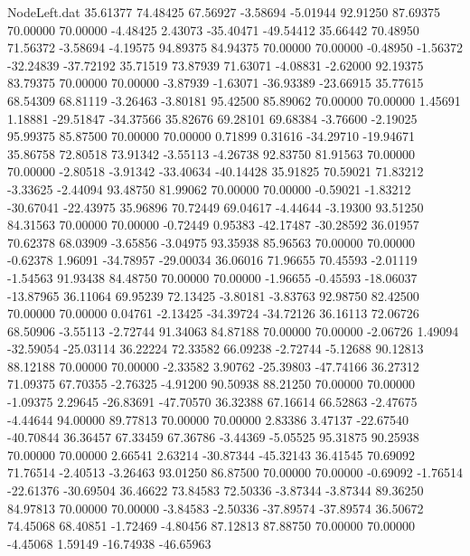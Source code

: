 \begin{filecontents}{NodeLeft.dat}
  35.61377   74.48425   67.56927    -3.58694   -5.01944   92.91250   87.69375   70.00000   70.00000   -4.48425    2.43073  -35.40471  -49.54412
  35.66442   70.48950   71.56372    -3.58694   -4.19575   94.89375   84.94375   70.00000   70.00000   -0.48950   -1.56372  -32.24839  -37.72192
  35.71519   73.87939   71.63071    -4.08831   -2.62000   92.19375   83.79375   70.00000   70.00000   -3.87939   -1.63071  -36.93389  -23.66915
  35.77615   68.54309   68.81119    -3.26463   -3.80181   95.42500   85.89062   70.00000   70.00000    1.45691    1.18881  -29.51847  -34.37566
  35.82676   69.28101   69.68384    -3.76600   -2.19025   95.99375   85.87500   70.00000   70.00000    0.71899    0.31616  -34.29710  -19.94671
  35.86758   72.80518   73.91342    -3.55113   -4.26738   92.83750   81.91563   70.00000   70.00000   -2.80518   -3.91342  -33.40634  -40.14428
  35.91825   70.59021   71.83212    -3.33625   -2.44094   93.48750   81.99062   70.00000   70.00000   -0.59021   -1.83212  -30.67041  -22.43975
  35.96896   70.72449   69.04617    -4.44644   -3.19300   93.51250   84.31563   70.00000   70.00000   -0.72449    0.95383  -42.17487  -30.28592
  36.01957   70.62378   68.03909    -3.65856   -3.04975   93.35938   85.96563   70.00000   70.00000   -0.62378    1.96091  -34.78957  -29.00034
  36.06016   71.96655   70.45593    -2.01119   -1.54563   91.93438   84.48750   70.00000   70.00000   -1.96655   -0.45593  -18.06037  -13.87965
  36.11064   69.95239   72.13425    -3.80181   -3.83763   92.98750   82.42500   70.00000   70.00000    0.04761   -2.13425  -34.39724  -34.72126
  36.16113   72.06726   68.50906    -3.55113   -2.72744   91.34063   84.87188   70.00000   70.00000   -2.06726    1.49094  -32.59054  -25.03114
  36.22224   72.33582   66.09238    -2.72744   -5.12688   90.12813   88.12188   70.00000   70.00000   -2.33582    3.90762  -25.39803  -47.74166
  36.27312   71.09375   67.70355    -2.76325   -4.91200   90.50938   88.21250   70.00000   70.00000   -1.09375    2.29645  -26.83691  -47.70570
  36.32388   67.16614   66.52863    -2.47675   -4.44644   94.00000   89.77813   70.00000   70.00000    2.83386    3.47137  -22.67540  -40.70844
  36.36457   67.33459   67.36786    -3.44369   -5.05525   95.31875   90.25938   70.00000   70.00000    2.66541    2.63214  -30.87344  -45.32143
  36.41545   70.69092   71.76514    -2.40513   -3.26463   93.01250   86.87500   70.00000   70.00000   -0.69092   -1.76514  -22.61376  -30.69504
  36.46622   73.84583   72.50336    -3.87344   -3.87344   89.36250   84.97813   70.00000   70.00000   -3.84583   -2.50336  -37.89574  -37.89574
  36.50672   74.45068   68.40851    -1.72469   -4.80456   87.12813   87.88750   70.00000   70.00000   -4.45068    1.59149  -16.74938  -46.65963

\end{filecontents}
